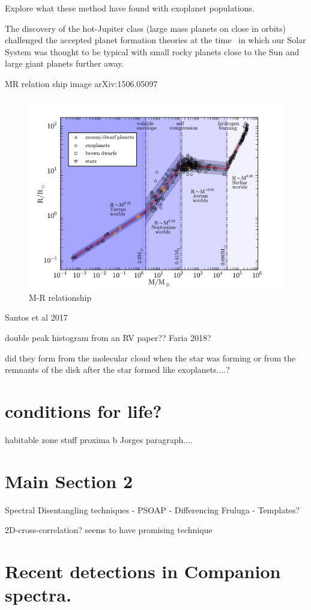 Explore what these method have found with exoplanet populations.

The discovery of the hot-Jupiter class (large mass planets on close in orbits) challenged the accepted planet formation theories at the time~\citep[.e.g][]{pollack_formation_1996} in which our Solar System was thought to be typical with small rocky planets close to the Sun and large giant planets further away.



MR relation ship image arXiv:1506.05097~\citet{chen_probabilistic_2016}

\begin{figure}
    \centering
    \includegraphics[width=0.4\linewidth]{./figures/introduction/mass_radius_relation.pdf}
    \caption{M-R relationship~\citet{chen_probabilistic_2016}}
    \label{fig:mass_radius_relation}
\end{figure}

Santos et al 2017 


double peak histogram from an {RV} paper?? Faria 2018?


did they form from the molecular cloud when the star was forming or from the remnants of the disk after the star formed like exoplanets....?


\section{ conditions for life?}
habitable zone stuff
proxima b
Jorges paragraph....

\section{Main Section 2}


Spectral Disentangling techniques
- PSOAP
- Differencing Fruluga
- Templates?


2D-cross-correlation?   \citet{piskorz_evidence_2016} seems to have promising technique


\section{Recent detections in Companion spectra.}

